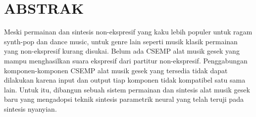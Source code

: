 \clearpage
\chapter*{ABSTRAK}

Meski permainan dan sintesis non-ekspresif yang kaku lebih populer untuk ragam synth-pop dan dance music, untuk genre lain seperti musik klasik permainan yang non-ekspresif kurang disukai. Belum ada CSEMP alat musik gesek yang mampu menghasilkan suara ekspresif dari partitur non-ekspresif. Penggabungan komponen-komponen CSEMP alat musik gesek yang tersedia tidak dapat dilakukan karena input dan output tiap komponen tidak kompatibel satu sama lain. Untuk itu, dibangun sebuah sistem permainan dan sintesis alat musik gesek baru yang mengadopsi teknik sintesis parametrik neural yang telah teruji pada sintesis nyanyian.

\clearpage